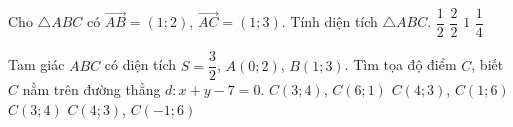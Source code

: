 \begin{vd}%
Cho $\triangle ABC$ có $\vec{ AB} =(1;2)$, $\vec{ AC} =(1;3)$. Tính diện tích $\triangle ABC$.
	\choice
{\True $\dfrac{1}{2}$}
{$\dfrac{2}{2}$}
{$1$}
{$\dfrac{1}{4}$}
\end{vd}

\begin{vd}%
	 Tam giác $ABC$ có diện tích $S=\dfrac{3}{2}$, $A(0;2)$, $B(1;3)$. Tìm tọa độ điểm $C$, biết $C$ nằm trên đường thẳng $d: x+y-7=0$.
	\choice
{$C(3;4)$, $C(6;1)$}
{\True $C(4;3)$, $C(1;6)$}
{$C(3;4)$}
{$C(4;3)$, $C(-1;6)$}

\end{vd}

